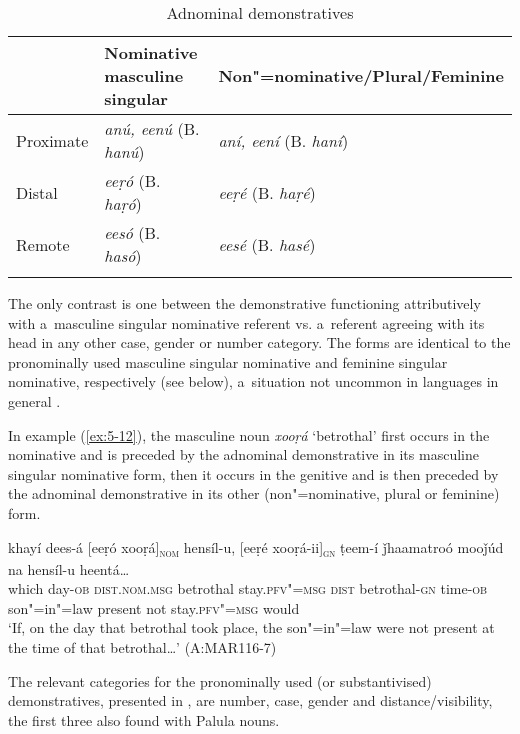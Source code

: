 \begin{table}[ht]
\caption{Adnominal demonstratives}
\begin{tabularx}{\textwidth}{ l@{\hspace{30pt}} Q Q }
\lsptoprule
&
Nominative masculine singular &
Non"=nominative/{\allowbreak}Plural/{\allowbreak}Feminine\\\hline
Proximate &
\textit{anú, eenú} (B. \textit{hanú}) &
\textit{aní, eení} (B. \textit{haní})\\
Distal &
\textit{eeṛó} (B. \textit{haṛó}) &
\textit{eeṛé} (B. \textit{haṛé})\\
Remote &
\textit{eesó} (B. \textit{hasó}) &
\textit{eesé} (B. \textit{hasé})\\\lspbottomrule
\end{tabularx}
\label{tab:5-3}
\end{table}

The only contrast is one between the demonstrative functioning attributively with a~masculine singular nominative referent vs. a~referent agreeing with its head in any other case, gender or number category. The forms are identical to the pronominally used masculine singular nominative and feminine singular nominative, respectively (see below), a~situation not uncommon in languages in general \citep[214]{himmelmann1996}. 


In example (\ref{ex:5-12}), the masculine noun \textit{xooṛá} `betrothal' first occurs in the nominative and is preceded by the adnominal demonstrative in its masculine singular nominative form, then it occurs in the genitive and is then preceded by the adnominal demonstrative in its other (non"=nominative, plural or feminine) form.


\begin{exe}
\ex
\label{ex:5-12}
\gll khayí dees-á [eeṛó xooṛá]\textsc{\textsubscript{nom}} hensíl-u, [eeṛé
 xooṛá-ii]\textsc{\textsubscript{gn}} ṭeem-í ǰhaamatroó mooǰúd na hensíl-u
heentá{\dots} \\
which day-\textsc{ob} \textsc{dist.nom.msg} betrothal stay.\textsc{pfv"=msg}
\textsc{dist} betrothal-\textsc{gn} time-\textsc{ob} son"=in"=law present not stay.\textsc{pfv"=msg} would\\
\glt `If, on the day that betrothal took place, the son"=in"=law were not present at the time of that betrothal{\ldots}' (A:MAR116-7)
\end{exe}

The relevant categories for the pronominally used (or substantivised) demonstratives, presented in
, are number, case, gender and distance/visibility, the first three also found with Palula
nouns.

